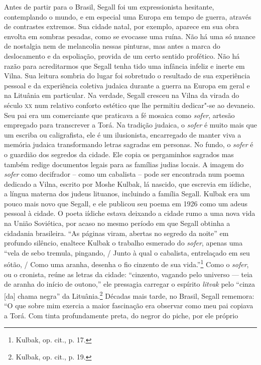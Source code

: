 Antes de partir para o Brasil, Segall foi um expressionista hesitante,
contemplando o mundo, e em especial uma Europa em tempo de guerra,
através de contrastes extremos. Sua cidade natal, por exemplo, aparece
em sua obra envolta em sombras pesadas, como se evocasse uma ruína. Não
há uma só nuance de nostalgia nem de melancolia nessas pinturas, mas
antes a marca do deslocamento e da espoliação, provida de um certo
sentido profético. Não há razão para acreditarmos que Segall tenha tido
uma infância infeliz e inerte em Vilna. Sua leitura sombria do lugar foi
sobretudo o resultado de sua experiência pessoal e da experiência
coletiva judaica durante a guerra na Europa em geral e na Lituânia em
particular. Na verdade, Segall cresceu na Vilna da virada do século \textsc{xx}
num relativo conforto estético que lhe permitiu dedicar"-se ao devaneio.
Seu pai era um comerciante que praticava a fé mosaica como \textit{sofer},
artesão empregado para transcrever a Torá. Na tradição judaica, o \textit{sofer}
é muito mais que um escriba ou caligrafista, ele é um ilusionista,
encarregado de manter viva a memória judaica transformando letras
sagradas em personas. No fundo, o \textit{sofer} é o guardião dos segredos da
cidade. Ele copia os pergaminhos sagrados mas também redige documentos
legais para as famílias judias locais. A imagem do \textit{sofer} como decifrador
-- como um cabalista -- pode ser encontrada num poema dedicado a Vilna, escrito por Moshe Kulbak,
lá nascido, que escrevia em iídiche, a língua materna dos judeus
lituanos, incluindo a família Segall. Kulbak era um pouco mais novo que
Segall, e ele publicou seu poema em 1926 como um adeus pessoal à cidade.
O poeta iídiche estava deixando a cidade rumo a uma nova vida na União
Soviética, por acaso no mesmo período em que Segall obtinha a cidadania
brasileira. ``As páginas viram, abertas no segredo da noite'' em
profundo silêncio, enaltece Kulbak o trabalho esmerado do \textit{sofer}, apenas
uma ``vela de sebo tremula, pingando, / Junto à qual o cabalista,
entrelaçado em seu sótão, / Como uma aranha, desenha o fio cinzento de
sua vida.''\footnote{Kulbak, op. cit., p. 17.} Como o \textit{sofer}, ou o cronista, reúne
as letras da cidade: ``cinzento, vagando pelo universo --- teia de aranha
do início de outono,'' ele pressagia carregar o espírito \textit{litvak} pelo
``cinza {[}da{]} chama negra'' da Lituânia.\footnote{Kulbak, op. cit., p. 19.}
Décadas mais tarde, no Brasil, Segall rememora: ``O que sobre mim
exercia a maior fascinação era observar como meu pai copiava a Torá. Com
tinta profundamente preta, do negror do piche, por ele próprio
